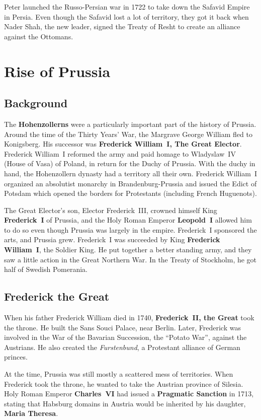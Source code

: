 Peter launched the Russo-Persian war in 1722 to take down the Safavid Empire in Persia.
Even though the Safavid lost a lot of territory,
they got it back when Nader Shah, the new leader,
signed the Treaty of Resht to create an alliance against the Ottomans.

\section{Rise of Prussia}

\subsection*{Background}

The \textbf{Hohenzollerns} were a particularly important part of the history of Prussia.
Around the time of the Thirty Years' War, the Margrave George William fled to Konigsberg.
His successor was \textbf{Frederick William~I, The Great Elector}.
Frederick William~I reformed the army and paid homage to Wladyslaw~IV (House of Vasa) of Poland,
in return for the Duchy of Prussia.
With the duchy in hand, the Hohenzollern dynasty had a territory all their own.
Frederick William~I organized an absolutist monarchy in Brandenburg-Prussia
and issued the Edict of Potsdam which opened the borders for Protestants (including French Huguenots).

The Great Elector's son, Elector Frederick~III, crowned himself King \textbf{Frederick~I} of Prussia,
and the Holy Roman Emperor \textbf{Leopold~I} allowed him to do so even though Prussia was largely in the empire.
Frederick~I sponsored the arts, and Prussia grew.
Frederick~I was succeeded by King \textbf{Frederick William~I}, the Soldier King.
He put together a better standing army, and they saw a little action in the Great Northern War.
In the Treaty of Stockholm, he got half of Swedish Pomerania.

\subsection*{Frederick the Great}

When his father Frederick William died in 1740, \textbf{Frederick~II, the Great} took the throne.
He built the Sans Souci Palace, near Berlin.
Later, Frederick was involved in the War of the Bavarian Succession, the ``Potato War'', against the Austrians.
He also created the \textit{Furstenbund}, a Protestant alliance of German princes.

At the time, Prussia was still mostly a scattered mess of territories.
When Frederick took the throne, he wanted to take the Austrian province of Silesia.
Holy Roman Emperor \textbf{Charles~VI} had issued a \textbf{Pragmatic Sanction} in 1713,
stating that Habsburg domains in Austria would be inherited by his daughter, \textbf{Maria Theresa}.

